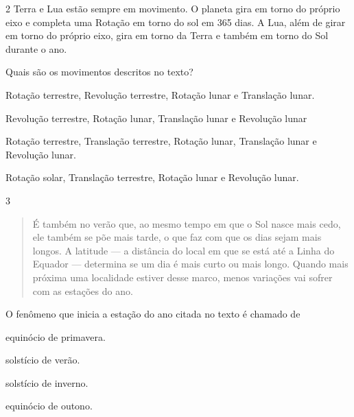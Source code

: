 \pagebreak
\num{2} Terra e Lua estão sempre em movimento. O planeta gira em
torno do próprio eixo e completa uma Rotação em torno do sol em 365
dias. A Lua, além de girar em torno do próprio eixo, gira em torno da
Terra e também em torno do Sol durante o ano.

Quais são os movimentos descritos no texto?

\begin{escolha}
\item Rotação terrestre, Revolução terrestre, Rotação lunar e Translação lunar.

\item Revolução terrestre, Rotação lunar, Translação lunar e Revolução lunar

\item Rotação terrestre, Translação terrestre, Rotação lunar, Translação lunar e Revolução lunar.

\item Rotação solar, Translação terrestre, Rotação lunar e Revolução lunar.
\end{escolha}

\num{3}

\begin{quote}
É também no verão que, ao mesmo tempo em que o Sol nasce mais cedo, ele
também se põe mais tarde, o que faz com que os dias sejam mais longos. A
latitude — a distância do local em que se está até a Linha do Equador
— determina se um dia é mais curto ou mais longo. Quando mais próxima
uma localidade estiver desse marco, menos variações vai sofrer com as
estações do ano.

\end{quote}

O fenômeno que inicia a estação do ano citada no texto é chamado de

\begin{minipage}{.5\textwidth}
\begin{escolha}
\item equinócio de primavera.

\item solstício de verão.

\item solstício de inverno.

\item equinócio de outono.
\end{escolha}
\end{minipage}




